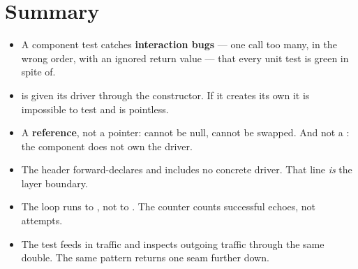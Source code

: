 \section*{Summary}

\begin{itemize}
  \item A component test catches \textbf{interaction bugs} --- one call too many, in the wrong
    order, with an ignored return value --- that every unit test is green in spite of.
  \item {} is given its driver through the constructor. If it creates its own it is
    impossible to test and  is pointless.
  \item A \textbf{reference}, not a pointer: cannot be null, cannot be swapped. And not a
    : the component does not own the driver.
  \item The header forward-declares  and includes no concrete driver. That line
    \emph{is} the layer boundary.
  \item The loop runs to , not to . The counter counts successful
    echoes, not attempts.
  \item The test feeds in traffic and inspects outgoing traffic through the same double. The same
    pattern returns one seam further down.
\end{itemize}
